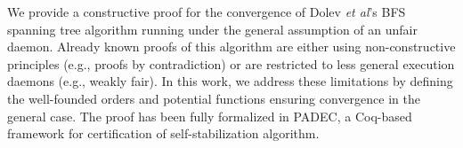 We provide a constructive proof for the convergence of Dolev \emph{et
al}'s BFS spanning tree algorithm running under the general assumption
of an unfair daemon.  Already known proofs of this algorithm are
either using non-constructive principles (e.g., proofs by
contradiction) or are restricted to less general execution daemons
(e.g., weakly fair).  In this work, we address these limitations by
defining the well-founded orders and potential functions ensuring
convergence in the general case.  The proof has been fully formalized
in PADEC, a Coq-based framework for certification of
self-stabilization algorithm.
